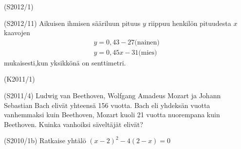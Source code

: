 \begin{tehtava} (S2012/1)
\end{tehtava}

\begin{tehtava} (S2012/11) 
Aikuisen ihmisen sääriluun pituus $y$ riippuu henkilön pituudesta $x$ kaavojen 
\[
\begin{aligned}
 y=0,43-27 \text{(nainen)} \\
 y=0,45x-31  \text{(mies)}
\end{aligned}
\]
mukaisesti,kun yksikkönä on senttimetri.

 

\end{tehtava}



\begin{tehtava} (K2011/1)
\end{tehtava}


\begin{tehtava}  (S2011/4)
Ludwig van Beethoven, Wolfgang Amadeus Mozart ja Johann Sebastian Bach elivät yhteensä 156 vuotta. Bach eli yhdeksän vuotta vanhemmaksi kuin Beethoven, Mozart kuoli 21 vuotta nuorempana kuin Beethoven. Kuinka vanhoiksi säveltäjät elivät?
\end{tehtava}

\begin{tehtava}  (S2010/1b)
Ratkaise yhtälö $(x-2)^2-4(2-x)=0$
\end{tehtava}

